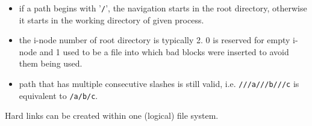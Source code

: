 
\begin{slide}
\begin{center}

\end{center}
\end{slide}

\begin{itemize}
\item if a path begins with '\texttt{/}', the navigation starts in the root
directory, otherwise it starts in the working directory of given process.
\item the i-node number of root directory is typically 2. 0 is reserved for
empty i-node and 1 used to be a file into which bad blocks were inserted to
avoid them being used.

\item path that has multiple consecutive slashes is still valid, i.e.
\texttt{///a///b///c} is equivalent to \texttt{/a/b/c}.
\end{itemize}




\begin{slide}
\begin{center}

\end{center}

Hard links can be created within one (logical) file system.
\end{slide}


